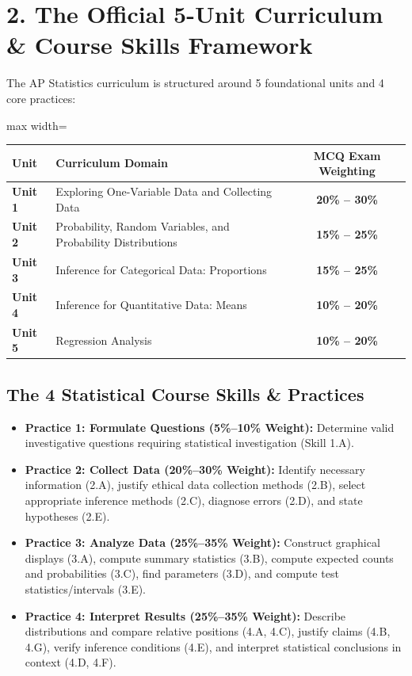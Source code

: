 \section*{2. The Official 5-Unit Curriculum \& Course Skills Framework}
The AP Statistics curriculum is structured around 5 foundational units and 4 core practices:

\begin{center}
\begin{adjustbox}{max width=\linewidth}
\begin{tabular}{llc}
\toprule
\textbf{Unit} & \textbf{Curriculum Domain} & \textbf{MCQ Exam Weighting} \\
\midrule
\textbf{Unit 1} & Exploring One-Variable Data and Collecting Data & \textbf{20\% -- 30\%} \\
\textbf{Unit 2} & Probability, Random Variables, and Probability Distributions & \textbf{15\% -- 25\%} \\
\textbf{Unit 3} & Inference for Categorical Data: Proportions & \textbf{15\% -- 25\%} \\
\textbf{Unit 4} & Inference for Quantitative Data: Means & \textbf{10\% -- 20\%} \\
\textbf{Unit 5} & Regression Analysis & \textbf{10\% -- 20\%} \\
\bottomrule
\end{tabular}
\end{adjustbox}
\end{center}

\subsection*{The 4 Statistical Course Skills \& Practices}
\begin{itemize}[leftmargin=1.5em]
  \item \textbf{Practice 1: Formulate Questions (5\%--10\% Weight):} Determine valid investigative questions requiring statistical investigation (Skill 1.A).
  \item \textbf{Practice 2: Collect Data (20\%--30\% Weight):} Identify necessary information (2.A), justify ethical data collection methods (2.B), select appropriate inference methods (2.C), diagnose errors (2.D), and state hypotheses (2.E).
  \item \textbf{Practice 3: Analyze Data (25\%--35\% Weight):} Construct graphical displays (3.A), compute summary statistics (3.B), compute expected counts and probabilities (3.C), find parameters (3.D), and compute test statistics/intervals (3.E).
  \item \textbf{Practice 4: Interpret Results (25\%--35\% Weight):} Describe distributions and compare relative positions (4.A, 4.C), justify claims (4.B, 4.G), verify inference conditions (4.E), and interpret statistical conclusions in context (4.D, 4.F).
\end{itemize}

